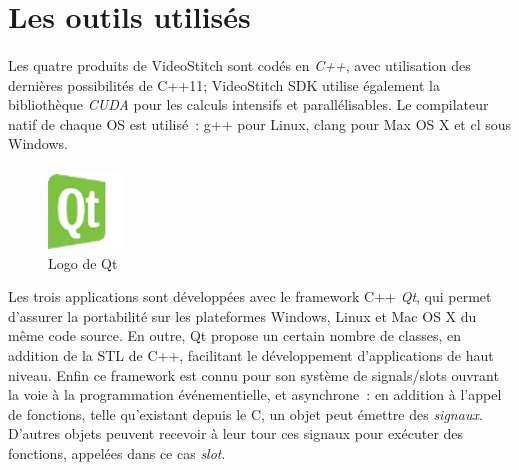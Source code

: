 \section{Les outils utilisés}
\label{outils-utilisés}
\paragraph{}
Les quatre produits de VideoStitch sont codés en \emph{C++}, avec utilisation des dernières possibilités
de C++11; VideoStitch SDK utilise également la bibliothèque \emph{CUDA} pour les calculs intensifs et parallélisables.
Le compilateur natif de chaque OS est utilisé~: g++ pour Linux, clang pour Max OS X et 
cl sous Windows.
\paragraph{}
\begin{figure}
  \centering
  \includegraphics[width=2cm]{images/qt-logo.png}
  \caption{Logo de Qt}
\end{figure}
Les trois applications sont  
développées avec le framework C++ \emph{Qt}, qui permet d'assurer la portabilité sur les 
plateformes Windows, Linux et Mac OS X du même code source. En outre, Qt
propose un certain nombre de classes, en addition de la STL de C++, facilitant le
développement d'applications de haut niveau. Enfin ce framework est connu pour son
système de signals/slots ouvrant la voie à la programmation événementielle, et
asynchrone~: en addition à l'appel de fonctions, telle qu'existant depuis le C,
un objet peut émettre des \textit{signaux}. D'autres objets peuvent recevoir à leur tour
ces signaux pour exécuter des fonctions, appelées dans ce cas \textit{slot}.\cite{qt}
